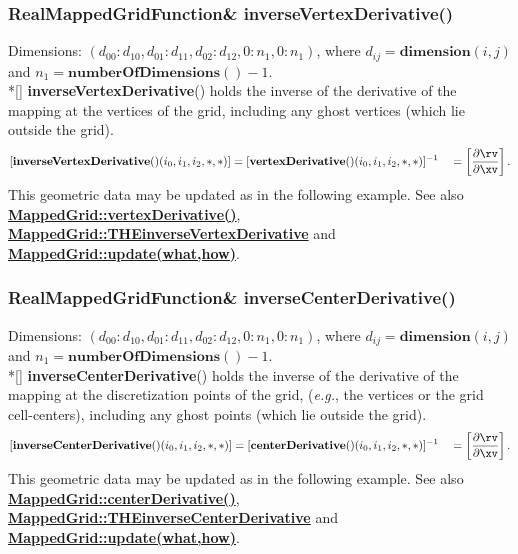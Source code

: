 \documentclass{article}
\begin{document}
  \subsubsection{RealMappedGridFunction\& inverseVertexDerivative()}
  \label{MappedGrid::inverseVertexDerivative()}
    Dimensions: $(d_{00}\colon d_{10},d_{01}\colon d_{11},d_{02}\colon d_{12},0\colon n_1,0\colon n_1)$,
    where $d_{ij} = \textbf{dimension}(i,j)$ and $n_1 = \textbf{numberOfDimensions}() - 1$. \\*[\parskip]
    \textbf{inverseVertexDerivative}() holds the inverse of the derivative of the mapping at the vertices of the grid,
    including any ghost vertices (which lie outside the grid).
    \[
      [ \textbf{inverseVertexDerivative}()(i_0,i_1,i_2,\ast,\ast) ] = 
      [ \textbf{vertexDerivative}()(i_0,i_1,i_2,\ast,\ast) ]^{-1} \quad=\left[{\partial \rv\over\partial\xv}\right].
    \]
    This geometric data may be updated as in the following example.
    See also {\bf{}\hyperref{vertexDerivative()}{vertexDerivative() \rm(\S}{)}{MappedGrid::vertexDerivative()}},
    {\bf{}\hyperref{THEinverseVertexDerivative}{THEinverseVertexDerivative \rm(\S}{)}{MappedGrid::THEinverseVertexDerivative}} and
    {\bf{}\hyperref{update(what,how)}{update(what,how) \rm(\S}{)}{MappedGrid::update(what,how)}}.


  \subsubsection{RealMappedGridFunction\& inverseCenterDerivative()}
  \label{MappedGrid::inverseCenterDerivative()}
    Dimensions: $(d_{00}\colon d_{10},d_{01}\colon d_{11},d_{02}\colon d_{12},0\colon n_1,0\colon n_1)$,
    where $d_{ij} = \textbf{dimension}(i,j)$ and $n_1 = \textbf{numberOfDimensions}() - 1$. \\*[\parskip]
    \textbf{inverseCenterDerivative}() holds the inverse of the derivative of the mapping at the discretization points of the grid,
    ({\sl{}e.g.}, the vertices or the grid cell-centers), including any ghost points (which lie outside the grid).
    \[
      [ \textbf{inverseCenterDerivative}()(i_0,i_1,i_2,\ast,\ast) ] = 
      [ \textbf{centerDerivative}()(i_0,i_1,i_2,\ast,\ast) ]^{-1} \quad=\left[{\partial \rv\over\partial\xv}\right].
    \]
    This geometric data may be updated as in the following example.
    See also {\bf{}\hyperref{centerDerivative()}{centerDerivative() \rm(\S}{)}{MappedGrid::centerDerivative()}},
    {\bf{}\hyperref{THEinverseCenterDerivative}{THEinverseCenterDerivative \rm(\S}{)}{MappedGrid::THEinverseCenterDerivative}}
    and {\bf{}\hyperref{update(what,how)}{update(what,how) \rm(\S}{)}{MappedGrid::update(what,how)}}.
\end{document}
